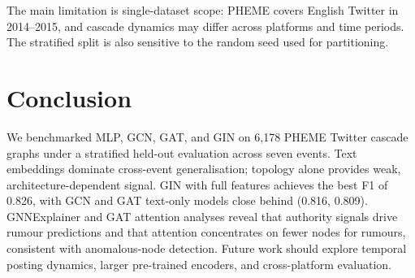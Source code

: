 \documentclass[runningheads]{llncs}
\begin{document}
The main limitation is single-dataset scope: PHEME covers English Twitter in
2014--2015, and cascade dynamics may differ across platforms and time periods.
The stratified split is also sensitive to the random seed used for partitioning.

\section{Conclusion}
\label{sec:conclusion}

We benchmarked MLP, GCN, GAT, and GIN on 6{,}178 PHEME Twitter cascade graphs
under a stratified held-out evaluation across seven events. Text embeddings
dominate cross-event generalisation; topology alone provides weak,
architecture-dependent signal. GIN with full features achieves the best F1 of
0.826, with GCN and GAT text-only models close behind (0.816, 0.809).
GNNExplainer and GAT attention analyses reveal that authority signals drive
rumour predictions and that attention concentrates on fewer nodes for rumours,
consistent with anomalous-node detection. Future work should explore temporal
posting dynamics, larger pre-trained encoders, and cross-platform evaluation.



\end{document}
